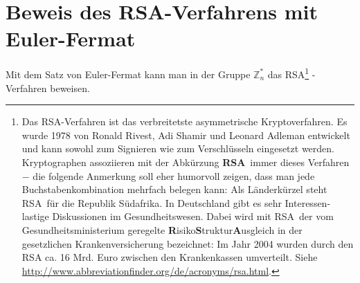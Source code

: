 \begin{refsegment}







\hypertarget{RSABeweis}{}
\section{Beweis des RSA-Verfahrens mit Euler-Fermat}
\label{rsabeweis}
Mit dem Satz von Euler-Fermat kann man in der Gruppe $\mathbb{Z}_n^*$ das
RSA\footnote{%
  Das RSA-Verfahren ist das verbreitetste asymmetrische
   Kryptoverfahren. Es wurde 1978 von Ronald
  Rivest, Adi Shamir und Leonard Adleman entwickelt und kann sowohl zum Signieren
  wie zum Verschlüsseln eingesetzt werden.
  Kryptographen assoziieren mit der Abkürzung \glqq \textbf{RSA}\grqq~immer dieses
  Verfahren $-$ die folgende Anmerkung soll eher humorvoll zeigen, dass man
  jede Buchstabenkombination mehrfach belegen kann: Als Länderkürzel steht
  \glqq RSA\grqq~für die Republik Südafrika. In Deutschland gibt es sehr
  Interessen-lastige Diskussionen im Gesundheitswesen. Dabei wird mit
  \glqq RSA\grqq~der vom Gesundheitsministerium geregelte
  \mbox{\glqq\textbf{R}isiko\textbf{S}truktur\textbf{A}usgleich\grqq} in der gesetzlichen
  Krankenversicherung bezeichnet: Im Jahr 2004 wurden durch den RSA ca. 16 Mrd. Euro
  zwischen den Krankenkassen umverteilt. Siehe \url{http://www.abbreviationfinder.org/de/acronyms/rsa.html}.
}%
-Verfahren \glqq beweisen\grqq.


\hypertarget{Chapter_ElementaryNT_10_1}{}

\end{refsegment}
